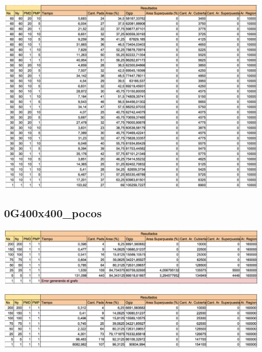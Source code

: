 \begin{center}
\includegraphics[width=1\textwidth]{imagenes/GML_45G100x100_muchos}
\end{center}

\subsection{0G400x400\_pocos}

\begin{center}
\includegraphics[width=1\textwidth]{imagenes/S_0G400x400_pocos}
\end{center}

\begin{center}
\includegraphics[width=1\textwidth]{imagenes/G_0G400x400_pocos}
\end{center}

